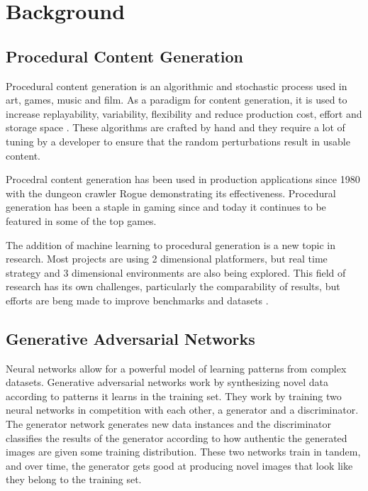 \documentclass[twocolumn]{article}
\begin{document}
	\section{Background}
			
	\subsection{Procedural Content Generation}
	
	Procedural content generation is an algorithmic and stochastic process used in art, games, music and film. As a paradigm for content generation, it is used to increase replayability, variability, flexibility and reduce production cost, effort and storage space \cite{summerville2017procedural}. These algorithms are crafted by hand and they require a lot of tuning by a developer to ensure that the random perturbations result in usable content.
	
	Procedral content generation has been used in production applications since 1980 with the dungeon crawler Rogue demonstrating its effectiveness. \cite{wiki:procedural} Procedural generation has been a staple in gaming since and today it continues to be featured in some of the top games.
	
	The addition of machine learning to procedural generation is a new topic in research. Most projects are using 2 dimensional platformers, but real time strategy and 3 dimensional environments are also being explored. This field of research has its own challenges, particularly the comparability of results, but efforts are beng made to improve benchmarks and datasets \cite{summerville2017procedural}.

	\subsection{Generative Adversarial Networks}
	
	Neural networks allow for a powerful model of learning patterns from complex datasets. Generative adversarial networks work by synthesizing novel data according to patterns it learns in the training set. They work by training two neural networks in competition with each other, a generator and a discriminator. The generator network generates new data instances and the discriminator classifies the results of the generator according to how authentic the generated images are given some training distribution. These two networks train in tandem, and over time, the generator gets good at producing novel images that look like they belong to the training set.
		
\end{document}
